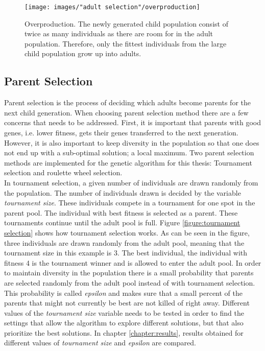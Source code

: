 \begin{figure}[h!]
\begin{center}
\texttt{[image: images/"adult selection"/overproduction]}
\caption{Overproduction. The newly generated child population consist of twice as many individuals as there are room for in the adult population. Therefore, only the fittest individuals from the large child population grow up into adults.}
\label{figure:overproduction}
\end{center}
\end{figure}



\subsection{Parent Selection}\label{subsection:parent selection}
Parent selection is the process of deciding which adults become parents for the next child generation. When choosing parent selection method there are a few concerns that needs to be addressed. First, it is important that parents with good genes, i.e. lower fitness, gets their genes transferred to the next generation. However, it is also important to keep diversity in the population so that one does not end up with a sub-optimal solution; a local maximum. Two parent selection methods are implemented for the genetic algorithm for this thesis: Tournament selection and roulette wheel selection. \\

\noindent In tournament selection, a given number of individuals are drawn randomly from the population. The number of individuals drawn is decided by the variable \textit{tournament size}. These individuals compete in a tournament for one spot in the parent pool. The individual with best fitness is  selected as a parent. These tournaments continue until the adult pool is full. Figure \ref{figure:tournament selection} shows how tournament selection works. As can be seen in the figure, three individuals are drawn randomly from the adult pool, meaning that the tournament size in this example is 3. The best individual, the individual with fitness 4 is the tournament winner and is allowed to enter the adult pool. In order to maintain diversity in the population there is a small probability that parents are selected randomly from the adult pool instead of with tournament selection. This probability is called \textit{epsilon} and makes sure that a small percent of the parents that might not currently be best are not killed of right away. Different values of the \textit{tournament size} variable needs to be tested in order to find the settings that allow the algorithm to explore different solutions, but that also prioritize the best solutions. In chapter \ref{chapter:results}, results obtained for different values of \textit{tournament size} and \textit{epsilon} are compared. \\


